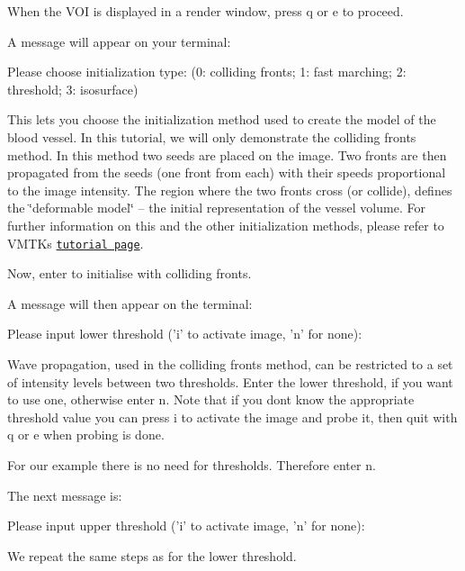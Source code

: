 When the V\+OI is displayed in a render window, press {\ttfamily q} or {\ttfamily e} to proceed.

A message will appear on your terminal\+:


\begin{DoxyCode}
Please choose initialization type: (0: colliding fronts; 1: fast
marching; 2: threshold; 3: isosurface)
\end{DoxyCode}


This lets you choose the initialization method used to create the model of the blood vessel. In this tutorial, we will only demonstrate the {\ttfamily colliding} {\ttfamily fronts} method. In this method two seeds are placed on the image. Two fronts are then propagated from the seeds (one front from each) with their speeds proportional to the image intensity. The region where the two fronts cross (or collide), defines the \char`\"{}deformable model\char`\"{} -- the initial representation of the vessel volume. For further information on this and the other initialization methods, please refer to V\+M\+TK\textquotesingle{}s \href{http://www.vmtk.org}{\tt tutorial page}.

Now, enter {} to initialise with {\ttfamily colliding} {\ttfamily fronts}.

A message will then appear on the terminal\+: 
\begin{DoxyCode}
Please input lower threshold (\textcolor{charliteral}{'i'} to activate image, \textcolor{charliteral}{'n'} \textcolor{keywordflow}{for} none):
\end{DoxyCode}


Wave propagation, used in the {\ttfamily colliding} {\ttfamily fronts} method, can be restricted to a set of intensity levels between two thresholds. Enter the lower threshold, if you want to use one, otherwise enter {\ttfamily n}. Note that if you don\textquotesingle{}t know the appropriate threshold value you can press {\ttfamily i} to activate the image and probe it, then quit with {\ttfamily q} or {\ttfamily e} when probing is done.

For our example there is no need for thresholds. Therefore enter {\ttfamily n}.

The next message is\+: 
\begin{DoxyCode}
Please input upper threshold (\textcolor{charliteral}{'i'} to activate image, \textcolor{charliteral}{'n'} \textcolor{keywordflow}{for} none):
\end{DoxyCode}


We repeat the same steps as for the lower threshold.

